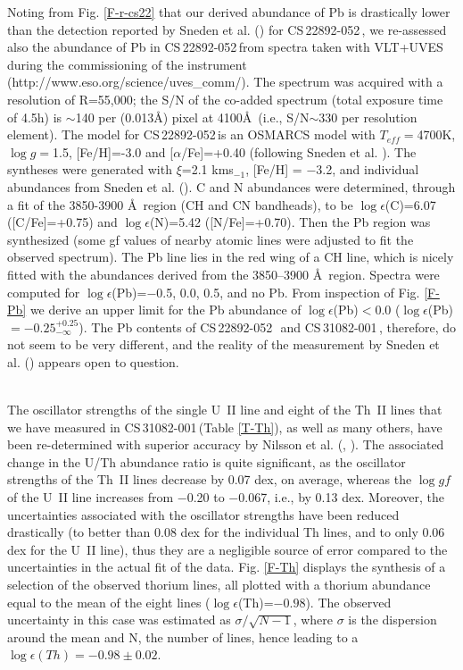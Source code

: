 \documentclass{aa}
\def\cs{CS\,31082-001\,}
\def\sned{CS\,22892-052\,}
\begin{document}
Noting from Fig. \ref{F-r-cs22} that our derived abundance of Pb is drastically
lower than the detection reported by Sneden et al. (\cite{sneden00})
for \sned,  
we re-assessed also the abundance of Pb in \sned from spectra taken
with VLT+UVES during the commissioning of the instrument
(http://www.eso.org/science/uves\_comm/). The spectrum was acquired
with a resolution of R=55,000; the S/N of the co-added spectrum 
(total exposure time of 4.5h) is $\sim$140 per (0.013\AA) pixel at 4100\AA\ 
(i.e., S/N$\sim$330 per resolution element).
The model for \sned is an OSMARCS
model with $T_{eff}=$4700K, $\log g=$1.5, [Fe/H]=-3.0 and [$\alpha$/Fe]=+0.40
(following Sneden et al. \cite{sneden00}).  The syntheses were generated with
$\xi$=2.1 kms$_{-1}$, [Fe/H] = $-$3.2, 
and individual abundances from Sneden et al.
(\cite{sneden96}). C and N abundances were determined, through a fit of the
3850-3900 \AA\ region (CH and CN bandheads), to be  $\log
\epsilon$(C)=6.07 ([C/Fe]=+0.75) and $\log \epsilon$(N)=5.42 ([N/Fe]=+0.70).
Then the Pb region was synthesized (some gf values of nearby atomic lines were
adjusted to fit the observed spectrum).  The Pb line lies in the red wing of a 
CH line, which is nicely fitted with the abundances derived from the
3850--3900 \AA\ region. Spectra were computed for $\log
\epsilon$(Pb)=$-$0.5, 0.0, 0.5,  
and no Pb. From inspection of Fig. \ref{F-Pb} we derive an upper limit for 
the Pb abundance of
$\log \epsilon$(Pb)$< 0.0$ ($\log \epsilon$(Pb)$= -0.25^{+0.25}_{-\infty}$).
The Pb contents of \sned\, and \cs, therefore, do not seem to be very
different,  and the reality of the measurement by Sneden et
al. (\cite{sneden00}) appears open to question.

\\
The oscillator strengths of the single U~II line and eight of the Th~II lines
that we have measured in \cs (Table \ref{T-Th}), as well as many others, have
been re-determined with superior accuracy by Nilsson et al. (\cite{nilsson01a},
\cite{nilsson01b}). The associated change in the U/Th abundance ratio is quite
significant, as the oscillator strengths of the Th~II lines decrease by 0.07
dex, on average, whereas the $\log gf$ of the U~II line increases from $-$0.20
to $-$0.067, i.e., by 0.13 dex.  Moreover, the uncertainties associated with
the oscillator strengths have been reduced drastically (to better than 0.08
dex for the individual Th lines, and to only 0.06 dex for the U~II line), thus
they are a negligible source of error compared to the uncertainties in the
actual fit of the data.  Fig. \ref{F-Th} displays the synthesis of a
selection of the observed thorium lines, all plotted with a thorium abundance
equal to the mean of the eight lines ($\log \epsilon$(Th)=$-0.98$). 
The observed
uncertainty in this case was estimated as $\sigma/\sqrt{N-1}$, where $\sigma$
is the dispersion around the mean and N, the number of lines, hence leading to
a $\log \epsilon(Th)=-0.98\pm 0.02$.  
\end{document}
